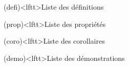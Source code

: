 \documentclass[../../main/main.tex]{subfiles}
\begin{document}


\vspace*{\fill}
\minitoc
\vspace*{\fill}

\newpage

\vspace*{\fill}
\begin{boxes}
	\footnotesize
	\begin{tcb}(defi)<lftt>{Liste des définitions}
	\end{tcb}
	\begin{tcb}(prop)<lftt>{Liste des propriétés}
	\end{tcb}
	\begin{tcb}(coro)<lftt>{Liste des corollaires}
	\end{tcb}
	\begin{tcb}(demo)<lftt>{Liste des démonstrations}

\end{tcb}
\end{boxes}
\end{document}
